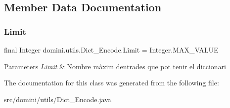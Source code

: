 \subsection{Member Data Documentation}
\mbox{\label{classdomini_1_1utils_1_1Dict__Encode_a48fe9a878056a119ad36a0aad2727a13}} 
\subsubsection{\texorpdfstring{Limit}{Limit}}
{\footnotesize\ttfamily final Integer domini.\+utils.\+Dict\+\_\+\+Encode.\+Limit = Integer.\+M\+A\+X\+\_\+\+V\+A\+L\+UE\hspace{0.3cm}{\ttfamily [static]}}


\begin{DoxyParams}{Parameters}
{\em Limit} & Nombre màxim d\textquotesingle{}entrades que pot tenir el diccionari \\
\hline
\end{DoxyParams}


The documentation for this class was generated from the following file\+:\begin{DoxyCompactItemize}
\item 
src/domini/utils/Dict\+\_\+\+Encode.\+java\end{DoxyCompactItemize}
